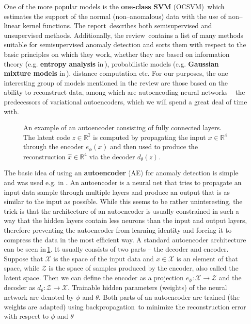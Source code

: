 One of the more popular models is the \textbf{one-class SVM} (OCSVM)\,\cite{scholkopf2001estimating}
which estimates the support of the normal (non--anomalous) data with
the use of non--linear kernel functions. The report\,\cite{chandola2009anomaly}
describes both semisupervised and unsupervised methods. Additionally,
the review\,\cite{pimentel2014review} contains a list of many methods
suitable for semisupervised anomaly detection and sorts them with
respect to the basic principles on which they work, whether they are
based on information theory (e.g. \textbf{entropy analysis} in\,\cite{he2005optimization}),
probabilistic models (e.g. \textbf{Gaussian mixture models} in\,\cite{mahadevan2010anomaly}),
distance computation etc. For our purposes, the one interesting group
of models mentioned in the review are those based on the ability to
reconstruct data, among which are autoencoding neural networks --
the predecessors of variational autoencoders, which we will spend
a great deal of time with.

\begin{figure}
\begin{centering}

\par\end{centering}
\centering{}\caption{An example of an autoencoder consisting of fully connected layers.
The latent code $z\in\mathbb{R}^{2}$ is computed by propagating the
input $x\in\mathbb{R}^{4}$ through the encoder $e_{\phi}(x)$ and
then used to produce the reconstruction $\hat{x}\in\mathbb{R}^{4}$
via the decoder $d_{\theta}(z)$.}
\label{fig:ae}
\end{figure}

The basic idea of using an \textbf{autoencoder} (AE) for anomaly detection
is simple and was used e.g. in \cite{sakurada2014anomaly,thompson2002implicit}.
An autoencoder is a neural net that tries to propagate an input data
sample through multiple layers and produce an output that is as similar
to the input as possible. While this seems to be rather uninteresting,
the trick is that the architecture of an autoencoder is usually constrained
in such a way that the hidden layers contain less neurons than the
input and output layers, therefore preventing the autoencoder from
learning identity and forcing it to compress the data in the most
efficient way. A standard autoencoder architecture can be seen in\,\ref{fig:ae}.
It usually consists of two parts -- the decoder and encoder. Suppose
that $\mathcal{X}$ is the space of the input data and $x\in\mathcal{X}$
is an element of that space, while $\mathcal{Z}$ is the space of
samples produced by the encoder, also called the latent space. Then
we can define the encoder as a projection $e_{\phi}:\mathcal{X}\rightarrow\mathcal{Z}$
and the decoder as $d_{\theta}:\mathcal{Z}\rightarrow\mathcal{X}$.
Trainable hidden parameters (weights) of the neural network are denoted
by $\phi$ and $\theta$. Both parts of an autoencoder are trained
(the weights are adapted) using backpropagation\,\cite{werbos1982applications}
to minimize the reconstruction error with respect to $\phi$ and $\theta$

